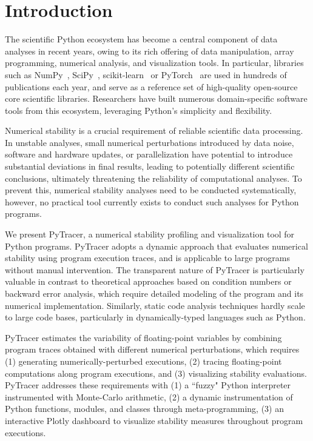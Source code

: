 \documentclass[11pt]{article}
\newcommand{\pytracer}[0]{PyTracer\xspace}
\begin{document}
\section{Introduction}

The scientific Python ecosystem has become a central component of data
analyses in recent years, owing to its rich offering of data manipulation, array programming,
numerical analysis, and visualization tools. In particular, libraries such
as NumPy~\cite{harris2020array}, SciPy~\cite{virtanen2020scipy}, scikit-learn~\cite{pedregosa2011scikit} or PyTorch~\cite{paszke2019pytorch} are used in hundreds of publications each year, and serve as a reference set of high-quality open-source core scientific libraries. Researchers have built numerous domain-specific software tools from this ecosystem, leveraging Python's simplicity and flexibility. 

Numerical stability is a crucial requirement of reliable scientific data
processing. In unstable analyses, small numerical perturbations introduced by data noise, software and hardware updates, or parallelization have potential to introduce substantial deviations in final results, leading to potentially different scientific conclusions, ultimately threatening the reliability of computational analyses. To prevent this, numerical stability analyses need to be conducted systematically, however, no practical tool currently exists to conduct such analyses for Python programs.

We present PyTracer, a numerical stability profiling and visualization tool for Python programs.
\pytracer adopts a dynamic approach that evaluates numerical stability using program execution traces, and is applicable to large programs without manual intervention. The transparent nature of \pytracer is particularly valuable in contrast to theoretical approaches based on condition numbers or backward error analysis, which require detailed modeling of the program and its numerical implementation. Similarly, static code analysis techniques hardly scale to large code bases, particularly in dynamically-typed languages such as Python.

\pytracer estimates the variability of floating-point variables by combining program traces obtained with different numerical perturbations, which requires (1) generating numerically-perturbed executions, (2) tracing floating-point computations along program executions, and (3) visualizing stability evaluations. \pytracer addresses these requirements with (1) a ``fuzzy" Python interpreter instrumented with Monte-Carlo arithmetic, (2) a dynamic instrumentation of Python functions, modules, and classes through meta-programming, (3) an interactive Plotly dashboard to visualize stability measures throughout program executions.
\end{document}
